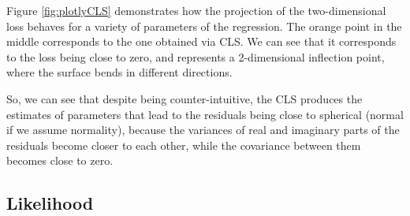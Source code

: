 \documentclass[
]{book}
\begin{document}
Figure \ref{fig:plotlyCLS} demonstrates how the projection of the two-dimensional loss behaves for a variety of parameters of the regression. The orange point in the middle corresponds to the one obtained via CLS. We can see that it corresponds to the loss being close to zero, and represents a 2-dimensional inflection point, where the surface bends in different directions.

So, we can see that despite being counter-intuitive, the CLS produces the estimates of parameters that lead to the residuals being close to spherical (normal if we assume normality), because the variances of real and imaginary parts of the residuals become closer to each other, while the covariance between them becomes close to zero.

\hypertarget{likelihood}{%
\subsection{Likelihood}\label{likelihood}}
\end{document}
